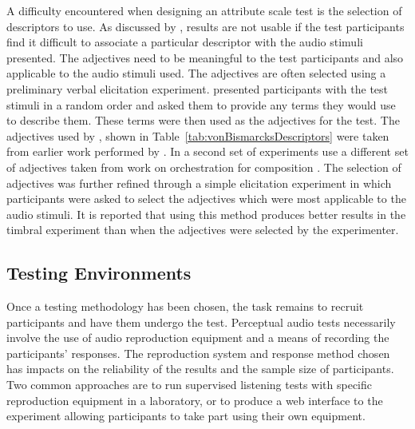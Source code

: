			A difficulty encountered when designing an attribute scale test is the selection of descriptors to
			use. As discussed by \citet{darke2005assessment}, results are not usable if the test participants
			find it difficult to associate a particular descriptor with the audio stimuli presented. The
			adjectives need to be meaningful to the test participants and also applicable to the audio stimuli
			used. The adjectives are often selected using a preliminary verbal elicitation experiment.
			\citet{namba1991verbal} presented participants with the test stimuli in a random order and asked
			them to provide any terms they would use to describe them. These terms were then used as the
			adjectives for the test. The adjectives used by \citet{kendall1993verbal1}, shown in
			Table~\ref{tab:vonBismarcksDescriptors} were taken from earlier work performed by
			\citet{vonbismarck1974timbre}. In a second set of experiments \citet{kendall1993verbal2} use a
			different set of adjectives taken from work on orchestration for composition
			\citep{piston1955orchestration}. The selection of adjectives was further refined through a simple
			elicitation experiment in which participants were asked to select the adjectives which were most
			applicable to the audio stimuli. It is reported that using this method produces better results in
			the timbral experiment than when the adjectives were selected by the experimenter.

	\subsection{Testing Environments}
	\label{sec:Timbre-ListeningTests-Environments}
		Once a testing methodology has been chosen, the task remains to recruit participants and have them
		undergo the test. Perceptual audio tests necessarily involve the use of audio reproduction equipment and a
		means of recording the participants' responses. The reproduction system and response method chosen has
		impacts on the reliability of the results and the sample size of participants. Two common approaches are to
		run supervised listening tests with specific reproduction equipment in a laboratory, or to produce a web
		interface to the experiment allowing participants to take part using their own equipment.

